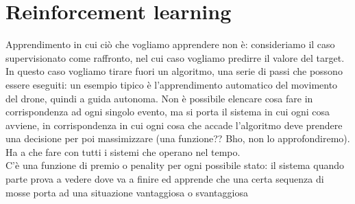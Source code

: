 \documentclass[12pt, oneside]{extbook}
\begin{document}
\section{Reinforcement learning}
Apprendimento in cui ciò che vogliamo apprendere non è: consideriamo il caso supervisionato come raffronto, nel cui caso vogliamo predirre il valore del target.\\In questo caso vogliamo tirare fuori un algoritmo, una serie di passi che possono essere eseguiti: un esempio tipico è l'apprendimento automatico del movimento del drone, quindi a guida autonoma. Non è possibile elencare cosa fare in corrispondenza ad ogni singolo evento, ma si porta il sistema in cui ogni cosa avviene, in corrispondenza in cui ogni cosa che accade l'algoritmo deve prendere una decisione per poi massimizzare (una funzione?? Bho, non lo approfondiremo).\\Ha a che fare con tutti i sistemi che operano nel tempo.\\C'è una funzione di premio o penality per ogni possibile stato: il sistema quando parte prova a vedere dove va a finire ed apprende che una certa sequenza di mosse porta ad una situazione vantaggiosa o svantaggiosa
\end{document}
